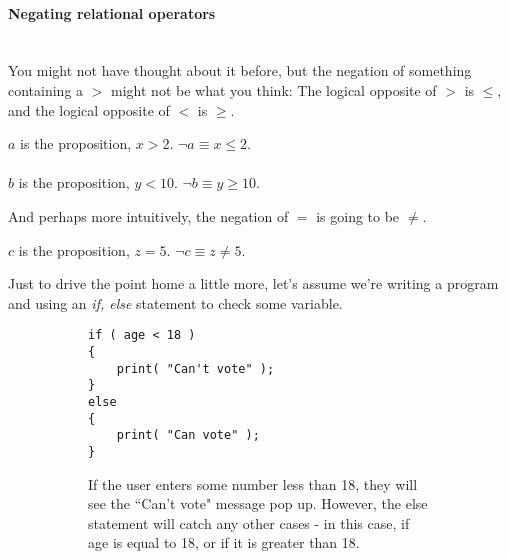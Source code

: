 \documentclass[../RachelNotes.tex]{subfiles}
\begin{document}
        \paragraph{Negating relational operators} ~\\
        You might not have thought about it before, but the negation of
        something containing a $>$ might not be what you think:
        The logical opposite of $>$ is $\leq$, and the logical opposite of $<$ is $\geq$.

        \begin{mdframed}
            $a$ is the proposition, $x > 2$. \tab
            $\neg a \equiv x \leq 2$.
            ~\\~\\
            $b$ is the proposition, $y < 10$. \tab{}
            $\neg b \equiv y \geq 10$.
        \end{mdframed}

        And perhaps more intuitively, the negation of $=$ is going to be $\neq$.
        
        \begin{mdframed}
            $c$ is the proposition, $z = 5$. \tab
            $\neg c \equiv z \neq 5$.
        \end{mdframed}

        \newpage
        Just to drive the point home a little more, let's assume we're
        writing a program and using an \textit{if, else} statement to
        check some variable.
    

\begin{figure}[h]
\centering
\begin{subfigure}{.5\textwidth}
    \centering
\begin{mdframed}
\begin{verbatim}
if ( age < 18 )
{
    print( "Can't vote" );
}
else
{
    print( "Can vote" );
}
\end{verbatim}
\end{mdframed}
\end{subfigure}%
\begin{subfigure}{.5\textwidth}
    \centering
    
    \begin{addmargin}[1em]{0em}
        If the user enters some number less than 18, they will see
        the ``Can't vote" message pop up. However, the else statement
        will catch any other cases - in this case, if age is equal to 18,
        or if it is greater than 18.
    \end{addmargin}
    
\end{subfigure}
\end{figure}
\end{document}
